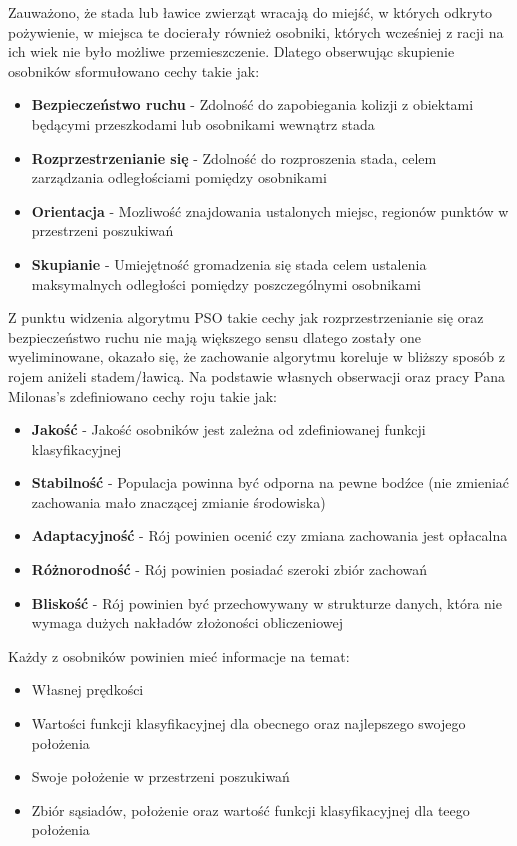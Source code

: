 \documentclass[eng, pl, oneside, openright, final, openbib]{mgr}\DeclareUnicodeCharacter{0301}{\'{e}}
\begin{document}
Zauważono, że stada lub ławice zwierząt wracają do miejść, w których odkryto pożywienie, w miejsca te docierały również osobniki, których wcześniej z racji na ich wiek nie było możliwe przemieszczenie. Dlatego obserwując skupienie osobników sformułowano cechy takie jak:
\begin{itemize}
\item \textbf{Bezpieczeństwo ruchu} - Zdolność do zapobiegania kolizji z obiektami będącymi przeszkodami lub osobnikami wewnątrz stada 
\item \textbf{Rozprzestrzenianie się} - Zdolność do rozproszenia stada, celem zarządzania odległościami pomiędzy osobnikami
\item \textbf{Orientacja} - Mozliwość znajdowania ustalonych miejsc, regionów punktów w przestrzeni poszukiwań 
\item \textbf{Skupianie} - Umiejętność gromadzenia się stada celem ustalenia maksymalnych odległości pomiędzy poszczególnymi osobnikami
\end{itemize}
Z punktu widzenia algorytmu PSO takie cechy jak rozprzestrzenianie się oraz bezpieczeństwo ruchu nie mają większego sensu dlatego zostały one wyeliminowane, okazało się, że zachowanie algorytmu koreluje w bliższy sposób z rojem aniżeli stadem/ławicą. Na podstawie własnych obserwacji oraz pracy Pana Milonas's zdefiniowano cechy roju takie jak: 
\begin{itemize}
\item \textbf{Jakość} - Jakość osobników jest zależna od zdefiniowanej funkcji klasyfikacyjnej
\item \textbf{Stabilność} - Populacja powinna być odporna na pewne bodźce (nie zmieniać zachowania mało znaczącej zmianie środowiska)
\item \textbf{Adaptacyjność} - Rój powinien ocenić czy zmiana zachowania jest opłacalna
\item \textbf{Różnorodność} - Rój powinien posiadać szeroki zbiór zachowań
\item \textbf{Bliskość} - Rój powinien być przechowywany w strukturze danych, która nie wymaga dużych nakładów złożoności obliczeniowej
\end{itemize}

Każdy z osobników powinien mieć informacje na temat:
\begin{itemize}
\item Własnej prędkości
\item Wartości funkcji klasyfikacyjnej dla obecnego oraz najlepszego swojego położenia
\item Swoje położenie w przestrzeni poszukiwań
\item Zbiór sąsiadów, położenie oraz wartość funkcji klasyfikacyjnej dla teego położenia
\end{itemize}
\end{document}
